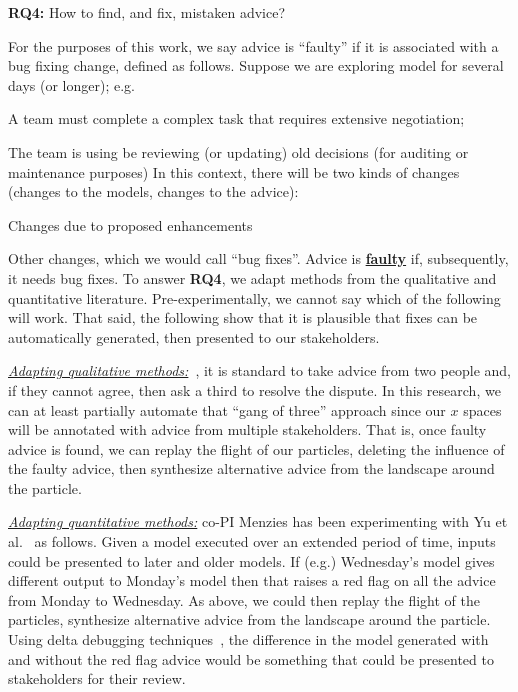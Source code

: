 \begin{formal}
{\bf RQ4:} How to find, and fix, mistaken advice?
\end{formal}
For the purposes of this work, we say
advice is ``faulty'' if it is associated with a bug fixing change, defined as follows.
Suppose we are   exploring
model   for   several days (or longer); e.g.
\bi
\item A team must complete a complex task that requires extensive negotiation;
\item The team is using be reviewing (or updating) old decisions (for auditing or maintenance purposes)
\ei
In this context, there will be two kinds of changes (changes to the models, changes to the advice):
\bi
\item
Changes due to proposed enhancements 
\item
Other changes,  which we would call ``bug fixes''.
Advice is 
\underline{\bf faulty} if,      subsequently, it needs   bug fixes.
\ei
To answer {\bf RQ4}, we  adapt  methods from the qualitative and quantitative
literature.  Pre-experimentally,
we cannot say which of the following will work. That said,   the following   show that it is plausible that   fixes can be automatically
generated, then presented to our stakeholders.

\underline{\em Adapting qualitative methods:}~\cite{Easterbrook08},
it is standard to   take advice from two people 
and, if they cannot agree, then ask a third to resolve the dispute. In this research, we can at least partially automate that ``gang of three'' approach since our $x$ spaces will be annotated with advice from multiple stakeholders.  That is, once faulty advice is found, we can replay the flight of our particles, deleting the influence of the faulty advice, then synthesize alternative advice from the landscape around the particle.

\underline{\em Adapting quantitative methods:}
co-PI Menzies
has been experimenting with Yu et al.~\cite{yu2019improving}  as follows.  Given a model  executed over an extended period of time,   inputs could be presented to later and older models.
If (e.g.) Wednesday's model
gives different output to Monday's model then that raises a red flag on all the advice from Monday to
Wednesday. As above, we could then replay the flight of the particles, synthesize alternative advice from the landscape around the particle. 
Using delta debugging techniques~\cite{Zeller99}, the difference in the model generated with and without the red flag advice would be something that could be presented to stakeholders for their review. 


